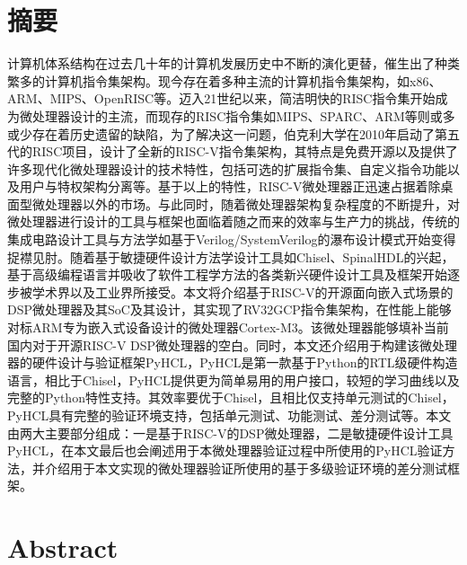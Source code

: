 \chapter{摘\texorpdfstring{\quad}{}要}

	计算机体系结构在过去几十年的计算机发展历史中不断的演化更替，催生出了种类繁多的计算机指令集架构。现今存在着多种主流的计算机指令集架构，如x86、ARM、MIPS、OpenRISC等。迈入21世纪以来，简洁明快的RISC指令集开始成为微处理器设计的主流，而现存的RISC指令集如MIPS、SPARC、ARM等则或多或少存在着历史遗留的缺陷，为了解决这一问题，伯克利大学在2010年启动了第五代的RISC项目，设计了全新的RISC-V指令集架构，其特点是免费开源以及提供了许多现代化微处理器设计的技术特性，包括可选的扩展指令集、自定义指令功能以及用户与特权架构分离等。基于以上的特性，RISC-V微处理器正迅速占据着除桌面型微处理器以外的市场。与此同时，随着微处理器架构复杂程度的不断提升，对微处理器进行设计的工具与框架也面临着随之而来的效率与生产力的挑战，传统的集成电路设计工具与方法学如基于Verilog/SystemVerilog的瀑布设计模式开始变得捉襟见肘。随着基于敏捷硬件设计方法学设计工具如Chisel、SpinalHDL的兴起，基于高级编程语言并吸收了软件工程学方法的各类新兴硬件设计工具及框架开始逐步被学术界以及工业界所接受。本文将介绍基于RISC-V的开源面向嵌入式场景的DSP微处理器及其SoC及其设计，其实现了RV32GCP指令集架构，在性能上能够对标ARM专为嵌入式设备设计的微处理器Cortex-M3。该微处理器能够填补当前国内对于开源RISC-V DSP微处理器的空白。同时，本文还介绍用于构建该微处理器的硬件设计与验证框架PyHCL，PyHCL是第一款基于Python的RTL级硬件构造语言，相比于Chisel，PyHCL提供更为简单易用的用户接口，较短的学习曲线以及完整的Python特性支持。其效率要优于Chisel，且相比仅支持单元测试的Chisel，PyHCL具有完整的验证环境支持，包括单元测试、功能测试、差分测试等。本文由两大主要部分组成：一是基于RISC-V的DSP微处理器，二是敏捷硬件设计工具PyHCL，在本文最后也会阐述用于本微处理器验证过程中所使用的PyHCL验证方法，并介绍用于本文实现的微处理器验证所使用的基于多级验证环境的差分测试框架。


\chapter{Abstract}


